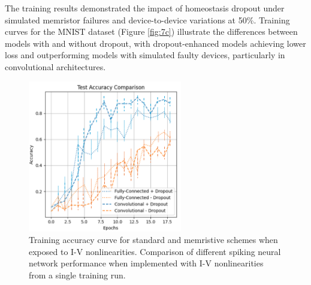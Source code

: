 
\noindent The training results demonstrated the impact of homeostasis dropout under simulated memristor failures and device-to-device variations at 50\%. Training curves for the MNIST dataset (Figure \ref{fig:7c}) illustrate the differences between models with and without dropout, with dropout-enhanced models achieving lower loss and outperforming models with simulated faulty devices, particularly in convolutional architectures.\\

\begin{figure}[!t]
    \centerline{\includegraphics[width=0.6\textwidth]{Chapter7/Figs/d.png}}
    \caption[Training accuracy curve for standard and memristive schemes when exposed to I-V nonlinearities]{Training accuracy curve for standard and memristive schemes when exposed to I-V nonlinearities. Comparison of different spiking neural network performance when implemented with I-V nonlinearities from a single training run.}
    \label{fig:7d}
\end{figure}
    

